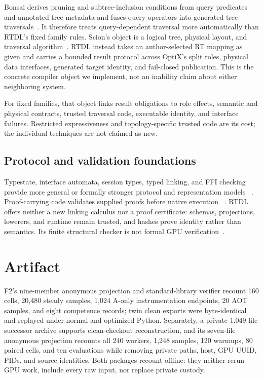 \documentclass[sigplan,screen,review,anonymous]{acmart}
\newcommand{\rtdl}{\textsc{RTDL}\xspace}
\begin{document}
Bonsai derives pruning and subtree-inclusion conditions from query predicates
and annotated tree metadata and fuses query operators into generated tree
traversals~\cite{root2026bonsai}. It therefore treats query-dependent traversal
more automatically than \rtdl's fixed family rules. Scion's object is a logical
tree, physical layout, and traversal algorithm~\cite{gyurgyik2026scion}. \rtdl instead takes an
author-selected RT mapping as given and carries a bounded result protocol across
OptiX's split roles, physical data interfaces, generated target identity, and
fail-closed publication. This is the concrete compiler object we implement, not
an inability claim about either neighboring system.

For fixed families, that object links result obligations to role effects,
semantic and physical contracts, trusted traversal code, executable identity,
and interface failures. Restricted expressiveness and topology-specific trusted
code are its cost; the individual techniques are not claimed as new.

\subsection{Protocol and validation foundations}

Typestate, interface automata, session types, typed linking, and FFI checking
provide more general or formally stronger protocol and representation models
~\cite{strom1986typestate,deAlfaro2001interfaceAutomata,honda2016multiparty,furr2005ffi,patterson2017linkingTypes}.
Proof-carrying code validates supplied proofs before native execution
~\cite{necula1996safe}. \rtdl offers neither a new linking calculus nor a proof
certificate: schemas, projections, lowerers, and runtime remain trusted, and
hashes prove identity rather than semantics. Its finite structural checker is
not formal GPU verification~\cite{betts2012gpuverify}.

\section{Artifact}

F2's nine-member anonymous projection and standard-library verifier recount 160
cells, 20,480 steady samples, 1,024 A-only instrumentation endpoints, 20 AOT
samples, and eight competence records; twin clean exports were byte-identical and
replayed under normal and optimized Python. Separately, a private 1,049-file
successor archive supports clean-checkout reconstruction, and its seven-file
anonymous projection recounts all 240 workers, 1,248 samples, 120 warmups, 80
paired cells, and ten evaluations while removing private paths, host, GPU UUID,
PIDs, and source identities. Both packages recount offline: they neither rerun
GPU work, include every raw input, nor replace private custody.
\end{document}
